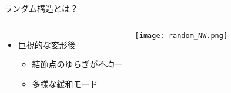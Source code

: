 \begin{columns}[T]
\begin{column}{.33\linewidth}
\begin{itembox}[l]{ランダム構造とは？}
\begin{columns}[totalwidth=.9\textwidth]
\begin{itemize}
                            \item 巨視的な変形後
                                \begin{itemize}
                                    \item 結節点のゆらぎが不均一
                                    \item 多様な緩和モード
                                \end{itemize}
                        \end{itemize}
                    \texttt{[image: random\_NW.png]}
            \end{columns}
        \end{itembox}
    \end{column}
\end{columns}